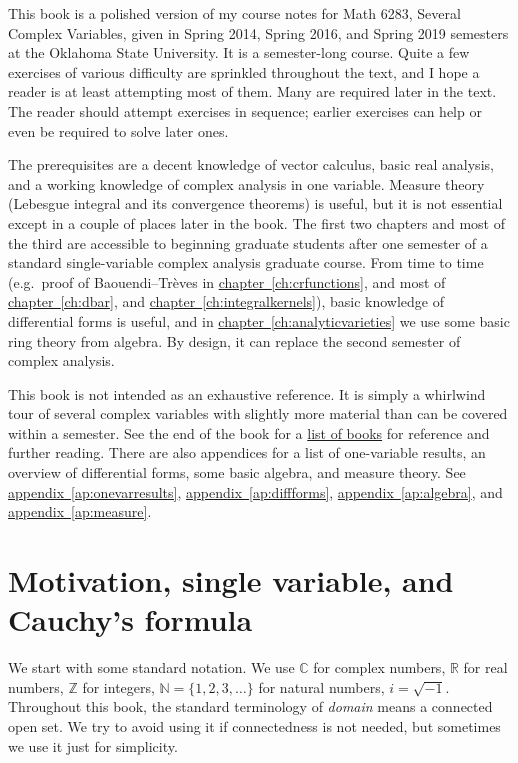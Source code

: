 \documentclass[12pt,openany]{book}
\newcommand{\C}{{\mathbb{C}}}
\newcommand{\R}{{\mathbb{R}}}
\newcommand{\Z}{{\mathbb{Z}}}
\newcommand{\N}{{\mathbb{N}}}
\newcommand{\myindex}[1]{#1\index{#1}}
\theoremstyle{plain}
\theoremstyle{remark}
\theoremstyle{definition}
\theoremstyle{exercise}
\theoremstyle{example}
\newcommand{\chapterref}[1]{\hyperref[#1]{chapter~\ref*{#1}}}
\newcommand{\appendixref}[1]{\hyperref[#1]{appendix~\ref*{#1}}}
\begin{document}

This book is a polished version of my course notes for Math 6283, Several
Complex Variables, given in
Spring 2014, Spring 2016, and Spring 2019 semesters
at the Oklahoma State University.
It is a semester-long course.
Quite a few exercises of various difficulty are
sprinkled throughout the text, and I hope a reader is
at least attempting most of them.  Many are required later in the
text.  The reader should attempt exercises in sequence; earlier exercises
can help or even be required to solve later ones.

The prerequisites are a decent knowledge of vector calculus, basic
real analysis, and a working knowledge of complex analysis in one variable.
Measure theory (Lebesgue integral and its convergence theorems) is useful,
but it is not essential except in a couple of places later in the book.
The first two chapters and most of the third
are accessible to beginning graduate students after one semester
of a standard single-variable complex
analysis graduate course.
From time to time (e.g.\ proof of Baouendi--Tr\`eves in
\chapterref{ch:crfunctions},
and most of
\chapterref{ch:dbar}, and \chapterref{ch:integralkernels}),
basic knowledge of differential forms is useful, and
in \chapterref{ch:analyticvarieties}
we use some basic ring theory from algebra.
By design, it can replace the second semester of complex analysis.

This book is not intended as an exhaustive reference.  It is simply a whirlwind
tour of several complex variables with slightly more material than can
be covered within a semester.  See the end of the book
for a \hyperref[ch:furtherreading]{list of books} for
reference and further reading.  There are also appendices for
a list of one-variable results, an overview of differential forms,
some basic algebra, and measure theory.
See \appendixref{ap:onevarresults},
\appendixref{ap:diffforms},
\appendixref{ap:algebra}, and
\appendixref{ap:measure}.


\section{Motivation, single variable, and Cauchy's formula} \label{sec:motivation}


We start with some standard notation.
We use $\C$ for complex numbers, $\R$
for real numbers,
$\Z$ for integers,
$\N = \{ 1,2,3,\ldots \}$ for natural
numbers,
$i = \sqrt{-1}$.  Throughout this book,
the standard terminology of \emph{\myindex{domain}} means a connected open
set.  We try to avoid using it if connectedness is not needed, but
sometimes we use it just for simplicity.
\end{document}
